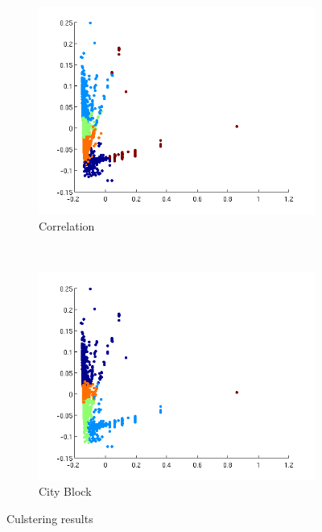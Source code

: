 \documentclass[a4paper,10pt]{article}
\begin{document}
\begin{figure}[h!]
        \begin{subfigure}[b]{0.4\textwidth}
                \includegraphics[width=\textwidth]{Images/correlation.png}
                \caption{Correlation}
    			\label{fig:correlation}
        \end{subfigure}
		~        
        \begin{subfigure}[b]{0.4\textwidth}
                \includegraphics[width=\textwidth]{Images/cityBlock.png}
                \caption{City Block}
    			\label{fig:cityBlock}
        \end{subfigure}%
        \caption{Culstering results}  
        \label{fig:cluster}
\end{figure}
\end{document}
